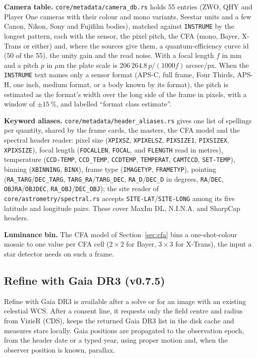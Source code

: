 \documentclass[11pt,a4paper]{article}
\newcommand{\code}[1]{\texttt{\small #1}}
\begin{document}
    \textbf{Camera table.} \code{core/metadata/camera\_db.rs} holds 55 entries (ZWO, QHY and Player One cameras with their colour and mono variants, Seestar units and a few Canon, Nikon, Sony and Fujifilm bodies), matched against \code{INSTRUME} by the longest pattern, each with the sensor, the pixel pitch, the CFA (mono, Bayer, X-Trans or either) and, where the sources give them, a quantum-efficiency curve id (50 of the 55), the unity gain and the read noise. With a focal length $f$ in mm and a pitch $p$ in $\mu$m the plate scale is $206\,264.8\,p / (1000 f)$\,arcsec/px. When the \code{INSTRUME} text names only a sensor format (APS-C, full frame, Four Thirds, APS-H, one inch, medium format, or a body known by its format), the pitch is estimated as the format's width over the long side of the frame in pixels, with a window of $\pm 15$\,\%, and labelled ``format class estimate''.

    \textbf{Keyword aliases.} \code{core/metadata/header\_aliases.rs} gives one list of spellings per quantity, shared by the frame cards, the masters, the CFA model and the spectral header reader: pixel size (\code{XPIXSZ}, \code{XPIXELSZ}, \code{PIXSIZE1}, \code{PIXSIZEX}, \code{XPIXSIZE}), focal length (\code{FOCALLEN}, \code{FOCAL}, and \code{FLENGTH} read in metres), temperature (\code{CCD-TEMP}, \code{CCD\_TEMP}, \code{CCDTEMP}, \code{TEMPERAT}, \code{CAMTCCD}, \code{SET-TEMP}), binning (\code{XBINNING}, \code{BINX}), frame type (\code{IMAGETYP}, \code{FRAMETYP}), pointing (\code{RA\_TARG}/\code{DEC\_TARG}, \code{TARG\_RA}/\code{TARG\_DEC}, \code{RA\_D}/\code{DEC\_D} in degrees, \code{RA}/\code{DEC}, \code{OBJRA}/\code{OBJDEC}, \code{RA\_OBJ}/\code{DEC\_OBJ}); the site reader of \code{core/astrometry/spectral.rs} accepts \code{SITE-LAT}/\code{SITE-LONG} among its five latitude and longitude pairs. These cover MaxIm DL, N.I.N.A. and SharpCap headers.

    \textbf{Luminance bin.} The CFA model of Section~\ref{sec:cfa} bins a one-shot-colour mosaic to one value per CFA cell ($2 \times 2$ for Bayer, $3 \times 3$ for X-Trans), the input a star detector needs on such a frame.

    \subsection{Refine with Gaia DR3 (v0.7.5)}
    \label{sec:gaia_refine}

    Refine with Gaia DR3 is available after a solve or for an image with an existing celestial WCS. After a consent line, it requests only the field centre and radius from VizieR (CDS), keeps the returned Gaia DR3 list in the disk cache and measures stars locally. Gaia positions are propagated to the observation epoch, from the header date or a typed year, using proper motion and, when the observer position is known, parallax.
\end{document}
